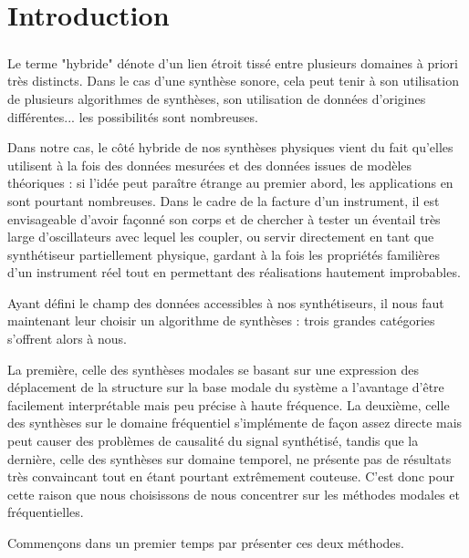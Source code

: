 \chapter*{Introduction}

\paragraph*{}
Le terme "hybride" dénote d'un lien étroit tissé entre plusieurs domaines à priori très distincts. Dans le cas d'une synthèse sonore, cela peut tenir à son utilisation de plusieurs algorithmes de synthèses, son utilisation de données d'origines différentes... les possibilités sont nombreuses.

Dans notre cas, le côté hybride de nos synthèses physiques vient du fait qu'elles utilisent à la fois des données mesurées et des données issues de modèles théoriques : si l'idée peut paraître étrange au premier abord, les applications en sont pourtant nombreuses. Dans le cadre de la facture d'un instrument, il est envisageable d'avoir façonné son corps et de chercher à tester un éventail très large d'oscillateurs avec lequel les coupler, ou servir directement en tant que synthétiseur partiellement physique, gardant à la fois les propriétés familières d'un instrument réel tout en permettant des réalisations hautement improbables.

Ayant défini le champ des données accessibles à nos synthétiseurs, il nous faut maintenant leur choisir un algorithme de synthèses : trois grandes catégories s'offrent alors à nous.

La première, celle des synthèses modales se basant sur une expression des déplacement de la structure sur la base modale du système a l'avantage d'être facilement interprétable mais peu précise à haute fréquence.
La deuxième, celle des synthèses sur le domaine fréquentiel s'implémente de façon assez directe mais peut causer des problèmes de causalité du signal synthétisé, tandis que la dernière, celle des synthèses sur domaine temporel, ne présente pas de résultats très convaincant tout en étant pourtant extrêmement couteuse.
C'est donc pour cette raison que nous choisissons de nous concentrer sur les méthodes modales et fréquentielles.

Commençons dans un premier temps par présenter ces deux méthodes.
